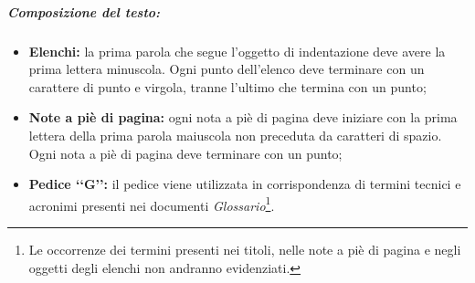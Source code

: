 \subparagraph{Composizione del testo:}
\label{composizione del testo}
\begin{itemize}
\item \textbf{Elenchi:} la prima parola che segue l'oggetto di indentazione deve avere la prima lettera minuscola. Ogni punto dell'elenco deve terminare con un carattere di punto e virgola, tranne l'ultimo che termina con un punto;
\item \textbf{Note a piè di pagina:} ogni nota a piè di pagina deve iniziare con la prima lettera della prima parola maiuscola non preceduta da caratteri di spazio. Ogni nota a piè di pagina deve terminare con un punto;
\item \textbf{Pedice \lq\lq{}G\rq\rq{}:} il pedice\glossario{} viene utilizzata in corrispondenza di termini tecnici e acronimi presenti nei documenti \emph{Glossario}\footnote{Le occorrenze dei termini presenti nei titoli, nelle note a piè di pagina e negli oggetti degli elenchi non andranno evidenziati.}. 
\end{itemize}

